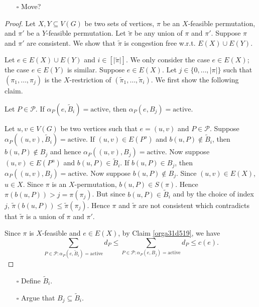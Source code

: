 \documentclass[fontsize=11pt,paper=a4]{book}
\begin{document}
\begin{itemize}
\item[{$\square$}] Move?
\end{itemize}

\begin{proof}
Let \(X,Y\subseteq V(G)\) be two sets of vertices, \(\pi\) be an \(X\)-feasible permutation, and \(\pi'\) be a \(Y\)-feasible permutation.
Let \(\tilde{\pi}\) be any union of \(\pi\) and \(\pi'\).
Suppose \(\pi\) and \(\pi'\) are consistent.
We show that \(\tilde{\pi}\) is congestion free w.r.t. \(E(X)\cup E(Y)\).

Let \(e\in E(X)\cup E(Y)\) and \(i\in [\lvert\tilde{\pi}\rvert]\).
We only consider the case \(e\in E(X)\); the case \(e\in E(Y)\) is similar.
Suppose \(e\in E(X)\).
Let \(j\in\{0,\dots,\lvert\pi\rvert\}\) such that \((\pi_1,\dots,\pi_j)\) is the \(X\)-restriction of \((\tilde{\pi}_1,\dots,\tilde{\pi}_i)\).
We first show the following claim.

\begin{claim}
Let \(P\in\mathcal{P}\).
If \(\alpha_P(e,\tilde{B}_i)=\mathrm{active}\), then \(\alpha_P(e,B_j)=\mathrm{active}\).
\label{orga31d519}
\end{claim}

\begin{proof2}
Let \(u,v\in V(G)\) be two vertices such that \(e=(u,v)\) and \(P\in\mathcal{P}\).
Suppose \(\alpha_P((u,v),\tilde{B}_i)=\mathrm{active}\).
If \((u,v)\in E(P^o)\) and \(b(u,P)\notin\tilde{B}_i\), then \(b(u,P)\notin B_j\) and hence \(\alpha_P((u,v),B_j)=\mathrm{active}\).
Now suppose \((u,v)\in E(P^u)\) and \(b(u,P)\in\tilde{B}_i\).
If \(b(u,P)\in B_j\), then \(\alpha_P((u,v),B_j)=\mathrm{active}\).
Now suppose \(b(u,P)\notin B_j\).
Since \((u,v)\in E(X)\), \(u\in X\).
Since \(\pi\) is an \(X\)-permutation, \(b(u,P)\in S(\pi)\).
Hence \(\pi(b(u,P))>j=\pi(\pi_j)\).
But since \(b(u,P)\in\tilde{B}_i\) and by the choice of index \(j\), \(\tilde{\pi}(b(u,P))\leq\tilde{\pi}(\pi_j)\).
Hence \(\pi\) and \(\tilde{\pi}\) are not consistent which contradicts that \(\tilde{\pi}\) is a union of \(\pi\) and \(\pi'\).
\end{proof2}

Since \(\pi\) is \(X\)-feasible and \(e\in E(X)\), by Claim \ref{orga31d519}, we have
\[
\sum_{P\in\mathcal{P}:\alpha_P(e,\tilde{B}_i)=\mathrm{active}}d_P\leq\sum_{P\in\mathcal{P}:\alpha_P(e,B_j)=\mathrm{active}}d_P\leq c(e).
\]
\end{proof}

\begin{itemize}
\item[{$\square$}] Define \(\tilde{B}_i\).
\item[{$\square$}] Argue that \(B_j\subseteq\tilde{B}_i\).
\end{itemize}
\end{document}
